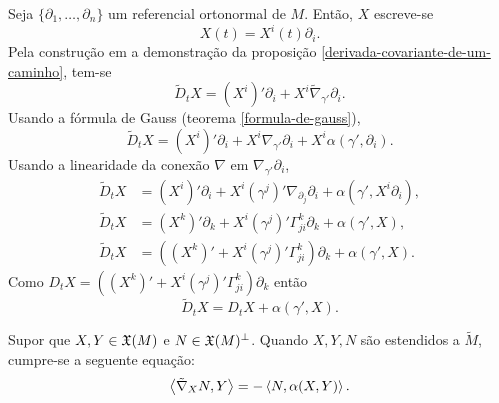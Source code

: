 \begin{demonstracao}
	Seja $\{\partial_1, \ldots, \partial_n \}$ um referencial ortonormal de $M$. Então, $X$ escreve-se
	\begin{equation*}
	X(t) = X^i(t) \partial_i.
	\end{equation*}
	Pela construção em a demonstração da proposição \ref{derivada-covariante-de-um-caminho}, tem-se
	\begin{equation*}
	\tilde{D}_t X = (X^i)' \partial_i + X^i \tilde{\nabla}_{\gamma'} \partial_i.
	\end{equation*}
	Usando a fórmula de Gauss (teorema \ref{formula-de-gauss}),
	\begin{equation*}
	\tilde{D}_t X = (X^i)' \partial_i + X^i \nabla_{\gamma'} \partial_i + X^i \alpha(\gamma', \partial_i).
	\end{equation*}
	Usando a linearidade da conexão $\nabla$ em $\nabla_{\gamma'} \partial_i$,
	\begin{align*}
	\tilde{D}_t X &= (X^i)' \partial_i + X^i (\gamma^j)' \nabla_{\partial_j} \partial_i + \alpha(\gamma', X^i \partial_i),\\
	\tilde{D}_t X &= (X^k)' \partial_k + X^i (\gamma^j)' \Gamma_{ji}^k \partial_k + \alpha(\gamma', X),\\
	\tilde{D}_t X &=  \left((X^k)' + X^i (\gamma^j)' \Gamma_{ji}^k\right) \partial_k + \alpha(\gamma', X).
	\end{align*}
	Como $D_t X = \left((X^k)' + X^i (\gamma^j)' \Gamma_{ji}^k\right) \partial_k$ então
	\begin{equation*}
	\tilde{D}_t X = D_t X + \alpha(\gamma',X).
	\end{equation*}
\end{demonstracao}

\begin{lema}\label{equacao-de-weingarten}
	Supor que $X,Y \in \mathfrak{X}(M)$ e $N \in \mathfrak{X}(M)^\perp$. Quando $X,Y,N$ são estendidos a $\tilde{M}$, cumpre-se a seguente equação:
	\begin{equation*}
		\left\langle \tilde{\nabla}_X N,Y \right\rangle = -\left\langle N,\alpha(X,Y) \right\rangle.
	\end{equation*}
\end{lema}

